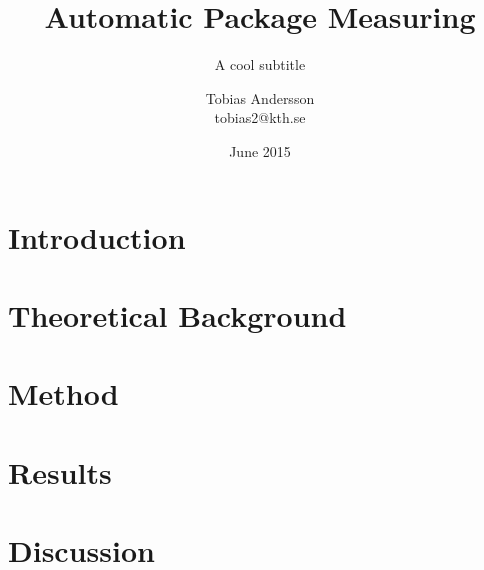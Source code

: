 \documentclass[a4paper,11pt]{kth-mag}
\title{Automatic Package Measuring}
\subtitle{A cool subtitle}
\author{Tobias Andersson\\\MakeLowercase{tobias2@kth.se}}
\date{June 2015}
\begin{document}
\frontmatter
\pagestyle{empty}
\removepagenumbers
\maketitle
{}




\clearpage



\clearpage
\tableofcontents*
\mainmatter


\pagestyle{newchap}

\chapter{Introduction}


\chapter{Theoretical Background}


\chapter{Method}


\chapter{Results}
\chapter{Discussion}






\end{document}
